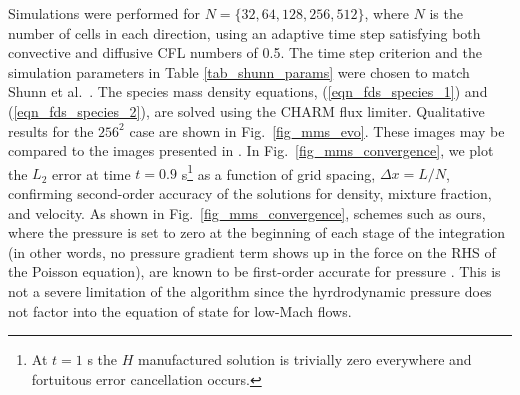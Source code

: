 \documentclass[11pt]{book}
\begin{document}
Simulations were performed for $N = \{32, 64, 128, 256, 512\}$, where $N$ is the number of cells in each direction, using an adaptive time step satisfying both convective and diffusive CFL numbers of 0.5.  The time step criterion and the simulation parameters in Table \ref{tab_shunn_params} were chosen to match Shunn et al.~\cite{Shunn:2012}. The species mass density equations, (\ref{eqn_fds_species_1}) and (\ref{eqn_fds_species_2}), are solved using the CHARM flux limiter. Qualitative results for the $256^2$ case are shown in Fig.~\ref{fig_mms_evo}.  These images may be compared to the images presented in \cite{Shunn:2012}.  In Fig.~\ref{fig_mms_convergence}, we plot the $L_2$ error at time $t = 0.9$ s\footnote{At $t=1$ s the $H$ manufactured solution is trivially zero everywhere and fortuitous error cancellation occurs.} as a function of grid spacing, $\Delta x = L/N$, confirming second-order accuracy of the solutions for density, mixture fraction, and velocity.  As shown in Fig.~\ref{fig_mms_convergence}, schemes such as ours, where the pressure is set to zero at the beginning of each stage of the integration (in other words, no pressure gradient term shows up in the force on the RHS of the Poisson equation), are known to be first-order accurate for pressure \cite{Armfield:2002}. This is not a severe limitation of the algorithm since the hyrdrodynamic pressure does not factor into the equation of state for low-Mach flows.
\end{document}
